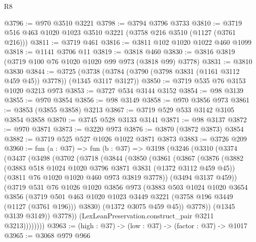 \begin{lexlean}{R8}
\begin{coremodule}
@3796 := @970 @3510 @3221
@3798 := @3794 @3796 @3733
@3810 := @3719 @516 @463 @1020 @1023 @3510 @3221 (@3758 @216 @3510 (@1127 (@3761 @216)))
@3811 := @3719 @461
@3816 := @3811 @102 @1020 @1022 @460 @1099
@3818 := @1141 @3706 @11
@3819 := @3818 @460
@3830 := @3816 @3819 (@3719 @100 @76 @1020 @1020 @99 @973 (@3818 @99) @3778)
@3831 := @3810 @3830
@3844 := @3725
    (@3738 (@3784 (@3790 (@3798 @3831 (@1161 @3112 @459 @45)) @3778)) (@1345 @3117 @3127))
@3850 := @3719 @535 @76 @3153 @1020 @3213 @973
@3853 := @3727 @534 @3144 @3152
@3854 := @98 @3139
@3855 := @970 @3854
@3856 := @98 @3149
@3858 := @970 @3856 @973
@3861 := @3853 (@3855 @3858) @3213
@3867 := @3719 @529 @533 @3142 @3105 @3854 @3858
@3870 := @3745 @528 @3133 @3141
@3871 := @98 @3137
@3872 := @970 @3871
@3873 := @3220 @973
@3876 := @3870 (@3872 @3873) @3854
@3882 := @3719 @525 @527 @1026 @1022 @3871 @3873
@3883 := @3726 @209
@3960 := fun (a : @37) =>
  fun (b : @37) =>
  @3198
    (@3246
      (@3310
        (@3374
          (@3437
            (@3498
              (@3702
                (@3718
                  (@3844
                    (@3850
                      (@3861
                        (@3867
                          (@3876
                            (@3882
                              (@3883 @518 @1024 @1020 @3796 @3871 @3831 (@1372 @3112 @459 @45))
                              (@3811 @76 @1020 @1020 @460 @973 @3819 @3778))
                            (@3494 @3137 @459))
                          (@3719
                            @531
                            @76
                            @1026
                            @1020
                            @3856
                            @973
                            (@3883
                              @503
                              @1024
                              @1020
                              @3654
                              @3856
                              (@3719
                                @501
                                @463
                                @1020
                                @1023
                                @3449
                                @3221
                                (@3758 @196 @3449 (@1127 (@3761 @196)))
                                @3830)
                              (@1372 @3075 @459 @45))
                            @3778))
                        (@1345 @3139 @3149))
                      @3778))
                  (LexLeanPreservation.construct_pair @3211 @3213))))))))
@3963 := (high : @37) -> (low : @37) -> (factor : @37) -> @1017
@3965 := @3068 @979 @966

\end{coremodule}
\end{lexlean}
